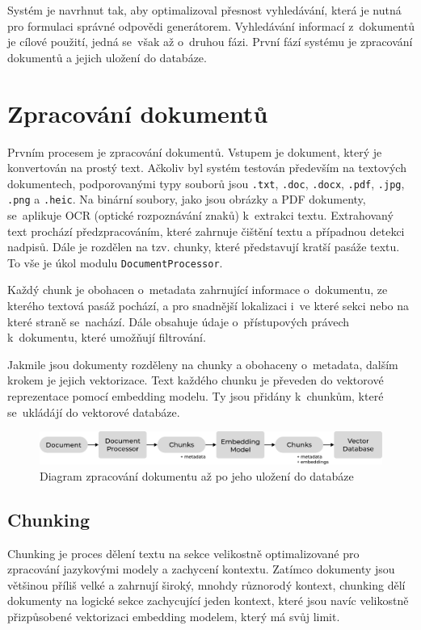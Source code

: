 Systém je navrhnut tak, aby optimalizoval přesnost vyhledávání, která je nutná pro formulaci správné odpovědi generátorem. Vyhledávání informací z~dokumentů je cílové použití, jedná se~však až o~druhou fázi. První fází systému je zpracování dokumentů a jejich uložení do databáze. 


\section{Zpracování dokumentů}
\label{zpracovani}
Prvním procesem je zpracování dokumentů. Vstupem je dokument, který je konvertován na prostý text. Ačkoliv byl systém testován především na textových dokumentech, podporovanými typy souborů jsou \texttt{.txt}, \texttt{.doc}, \texttt{.docx}, \texttt{.pdf}, \texttt{.jpg}, \texttt{.png} a \texttt{.heic}. Na binární soubory, jako jsou obrázky a PDF dokumenty, se~aplikuje OCR (optické rozpoznávání znaků) k~extrakci textu. Extrahovaný text prochází předzpracováním, které zahrnuje čištění textu a případnou detekci nadpisů. Dále je rozdělen na tzv. chunky, které představují kratší pasáže textu. To vše je úkol modulu \texttt{DocumentProcessor}. 


Každý chunk je obohacen o~metadata zahrnující informace o~dokumentu, ze kterého textová pasáž pochází, a pro snadnější lokalizaci i~ve které sekci nebo na které straně se~nachází. Dále obsahuje údaje o~přístupových právech k~dokumentu, které umožňují filtrování. 

Jakmile jsou dokumenty rozděleny na chunky a obohaceny o~metadata, dalším krokem je jejich vektorizace. Text každého chunku je převeden do vektorové reprezentace pomocí embedding modelu. Ty jsou přidány k~chunkům, které se~ukládájí do vektorové databáze.

\begin{figure}[H]
    \centering
    \includegraphics[width=1\linewidth]{obrazky/processing.pdf}
    \caption{Diagram zpracování dokumentu až po jeho uložení do databáze}
    \label{fig:zpracovani}
\end{figure}

\subsection{Chunking}
\label{chunking}
Chunking je proces dělení textu na sekce velikostně optimalizované pro zpracování jazykovými modely a zachycení kontextu. Zatímco dokumenty jsou většinou příliš velké a zahrnují široký, mnohdy různorodý kontext, chunking dělí dokumenty na logické sekce zachycující jeden kontext, které jsou navíc velikostně přizpůsobené vektorizaci embedding modelem, který má svůj limit.


